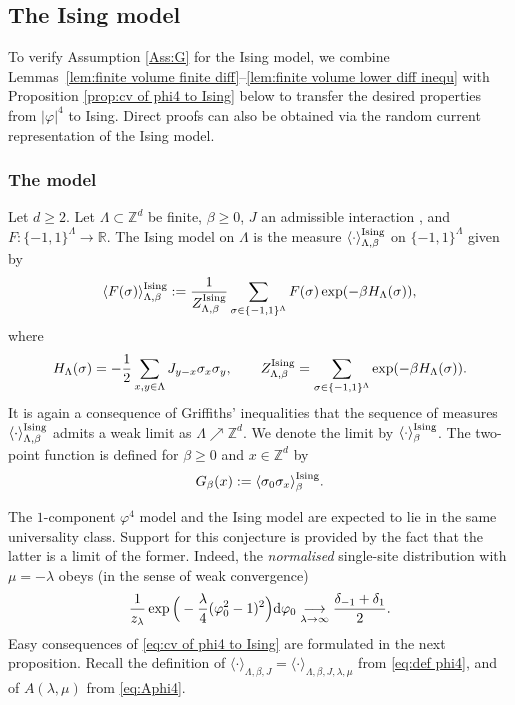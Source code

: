 \documentclass[11pt,a4paper]{article}
\numberwithin{equation}{section}
\theoremstyle{plain}
\theoremstyle{definition}
\newcommand\1{\mathds{1}}
\begin{document}
\subsection{The Ising model}
\label{sec:Ising}
To verify Assumption \ref{Ass:G} for the Ising model, we combine Lemmas~\ref{lem:finite volume finite diff}--\ref{lem:finite volume lower diff inequ} with Proposition \ref{prop:cv of phi4 to Ising} below to transfer the desired properties from $|\varphi|^4$ to Ising. Direct proofs can also be obtained via the random current representation \cite{Aize82,Dumi20} of the Ising model.
\subsubsection{The model}

Let $d\geq 2$. Let $\Lambda\subset \mathbb Z^d$ be finite, $\beta\geq 0$, $J$ an admissible interaction
, and $F:\{-1,1\}^\Lambda\rightarrow \mathbb R$. The Ising model on $\Lambda$ is the measure $\langle \cdot \rangle_{\Lambda,\beta}^{\rm Ising}$ on $\{-1,1\}^\Lambda$ given by
	\begin{equation}
		\langle F(\sigma)\rangle_{\Lambda,\beta}^{\rm Ising}:=\frac{1}{Z^{\rm Ising}_{\Lambda,\beta}}\sum_{\sigma \in \{-1,1\}^\Lambda}F(\sigma)\exp(-\beta H_{\Lambda}(\sigma)),
	\end{equation}
	where
	\begin{equation}
		H_{\Lambda}(\sigma)=
-
\frac 12 \sum_{x,y\in \Lambda}
J_{y-x}\sigma_x\sigma_y, \qquad Z_{\Lambda,\beta}^{\rm Ising}=\sum_{\sigma\in \{-1,1\}^\Lambda}\exp(-\beta H_{\Lambda}(\sigma)).
	\end{equation}
It is again a consequence of Griffiths' inequalities that the sequence of measures $\langle \cdot \rangle_{\Lambda,\beta}^{\rm Ising}$ admits a weak limit as $\Lambda \nearrow \mathbb Z^d$. We denote the limit by $\langle \cdot\rangle_\beta^{\rm Ising}$. The two-point function is defined for $\beta\geq 0$ and $x\in \mathbb Z^d$ by
\begin{equation}
	G_\beta(x):=\langle \sigma_0\sigma_x\rangle_{\beta}^{\rm Ising}.
\end{equation}

The $1$-component $\varphi^4$ model and the Ising model are expected to lie in the same universality class.  Support for this conjecture is provided by the fact that
the latter is a limit of the former.  Indeed, the \emph{normalised} single-site distribution
with $\mu=-\lambda$
obeys (in the sense of weak convergence)
\begin{equation}\label{eq:cv of phi4 to Ising} \frac{1}{z_\lambda}\exp\Big(-\frac{\lambda}{4}(\varphi_0^2-1)^2\Big){\rm d}\varphi_0\underset{\lambda \rightarrow \infty}{\longrightarrow} \frac{\delta_{-1}+\delta_1}{2}.
\end{equation}
Easy consequences of \eqref{eq:cv of phi4 to Ising} are formulated in the
next proposition. Recall the definition of $\langle \cdot\rangle_{\Lambda,\beta,J}=\langle \cdot\rangle_{\Lambda,\beta,J,\lambda,\mu}$ from \eqref{eq:def phi4},
and of $A(\lambda,\mu)$ from \eqref{eq:Aphi4}.
\end{document}
